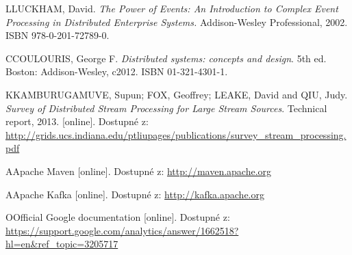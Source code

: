 \documentclass[
  digital, %
  table,   %
  nolof,     %
  nolot,     %
  twoside,
  nocover,
  monochrome,
  12pt
]{fithesis3}
\begin{document}
\begin{thebibliography}{99}
\bibitem
LLUCKHAM, David. \textit{The Power of Events: An Introduction to Complex
Event Processing in Distributed Enterprise Systems.} Addison-Wesley Professional, 2002. ISBN 978-0-201-72789-0. \label{bib_1}

\bibitem
CCOULOURIS, George F. \textit{Distributed systems: concepts and design}. 5th ed. Boston: Addison-Wesley, c2012. ISBN 01-321-4301-1. \label{bib_2}

\bibitem
KKAMBURUGAMUVE, Supun; FOX, Geoffrey; LEAKE, David and QIU, Judy. \textit{Survey of Distributed Stream Processing for Large Stream Sources}. Technical report, 2013. [online]. Dostupné z: \url{http://grids.ucs.indiana.edu/ptliupages/publications/survey_stream_processing.pdf} \label{bib_3}

\bibitem
AApache Maven [online]. Dostupné z: \url{http://maven.apache.org} \label{bib_4}

\bibitem
AApache Kafka [online]. Dostupné z: \url{http://kafka.apache.org} \label{bib_5}

\bibitem
OOfficial Google documentation  [online]. Dostupné z: \url{https://support.google.com/analytics/answer/1662518?hl=en&ref_topic=3205717} \label{bib_6}

\end{thebibliography}
\appendix %
\end{document}

